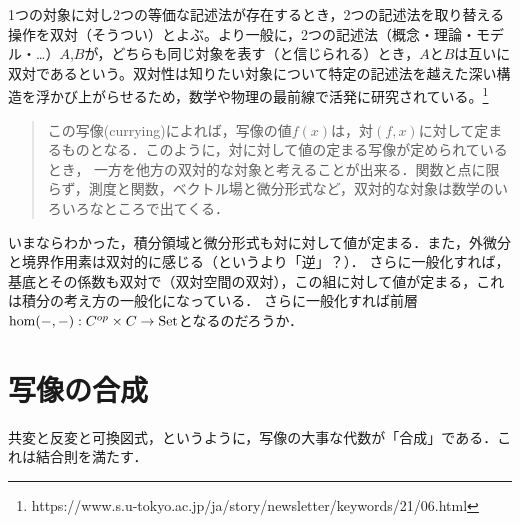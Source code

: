 \documentclass[uplatex, 12pt, dvipdfmx]{jsreport}
\begin{document}
\begin{remark}[双対性]
    1つの対象に対し2つの等価な記述法が存在するとき，2つの記述法を取り替える操作を双対（そうつい）とよぶ。より一般に，2つの記述法（概念・理論・モデル・…）$A$,$B$が，どちらも同じ対象を表す（と信じられる）とき，$A$と$B$は互いに双対であるという。双対性は知りたい対象について特定の記述法を越えた深い構造を浮かび上がらせるため，数学や物理の最前線で活発に研究されている。\footnote{https://www.s.u-tokyo.ac.jp/ja/story/newsletter/keywords/21/06.html}
    \begin{quote}
        この写像(currying)によれば，写像の値$f(x)$は，対$(f,x)$に対して定まるものとなる．このように，対に対して値の定まる写像が定められているとき，
        一方を他方の双対的な対象と考えることが出来る．関数と点に限らず，測度と関数，ベクトル場と微分形式など，双対的な対象は数学のいろいろなところで出てくる．
    \end{quote}
    いまならわかった，積分領域と微分形式も対に対して値が定まる．また，外微分と境界作用素は双対的に感じる（というより「逆」？）．
    さらに一般化すれば，基底とその係数も双対で（双対空間の双対），この組に対して値が定まる，これは積分の考え方の一般化になっている．
    さらに一般化すれば前層$\hom(-,-):C^{op}\times C\to\mathrm{Set}$となるのだろうか．
\end{remark}

\section{写像の合成}

\begin{screen}
    共変と反変と可換図式，というように，写像の大事な代数が「合成」である．これは結合則を満たす．
\end{screen}
\end{document}
